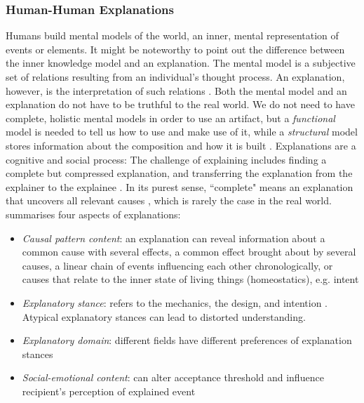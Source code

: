 \subsubsection{Human-Human Explanations}
Humans build mental models of the world, an inner, mental representation of events or elements. It might be noteworthy to point out the difference between the inner knowledge model and an explanation. The mental model is a subjective set of relations resulting from an individual's thought process. An explanation, however, is the interpretation of such relations \cite{keil2006explanation}. Both the mental model and an explanation do not have to be truthful to the real world. We do not need to have complete, holistic mental models in order to use an artifact, but a \textit{functional} model is needed to tell us how to use and make use of it, while a \textit{structural} model stores information about the composition and how it is built \cite{kulesza2013too}.\newline
Explanations are a cognitive and social process: The challenge of explaining includes finding a complete but compressed explanation, and transferring the explanation from the explainer to the explainee \cite{miller2017explanation}. In its purest sense, ``complete" means an explanation that uncovers all relevant causes \cite{miller2017explanation}, which is rarely the case in the real world.\newline
\cite{keil2006explanation} summarises four aspects of explanations:
\begin{itemize}
	\item \textit{Causal pattern content}: an explanation can reveal information about a common cause with several effects, a common effect brought about by several causes, a linear chain of events influencing each other chronologically, or causes that relate to the inner state of living things (homeostatics), e.g. intent
	\item \textit{Explanatory stance}: refers to the mechanics, the design, and intention \cite{miller2017explanation}. Atypical explanatory stances can lead to distorted understanding.
	\item \textit{Explanatory domain}: different fields have different preferences of explanation stances
	\item \textit{Social-emotional content}: can alter acceptance threshold and influence recipient's perception of explained event 
\end{itemize}
